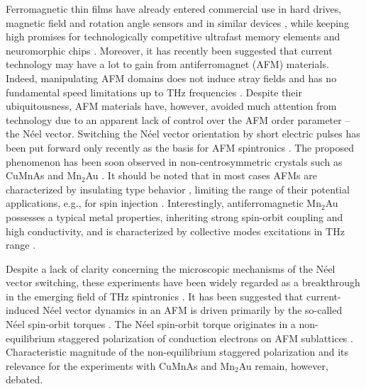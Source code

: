 \documentclass[%
  twocolumn,
  aps,
  prb,
  amsmath,
  amssymb,
  superscriptaddress,
  nofootinbib,
  floatfix
]{revtex4-1}
\newcommand{\0}{^{\phantom{\dagger}}}
\begin{document}
Ferromagnetic thin films have already entered commercial use in hard drives, magnetic field and rotation angle sensors and in similar devices  \cite{Parkin2003,Jogschies2015,Novoselov2019}, while keeping high promises for technologically competitive ultrafast memory elements \cite{Lau2016} and neuromorphic chips \cite{Fukami2016}. Moreover, it has recently been suggested that current technology may have a lot to gain from antiferromagnet (AFM) materials. Indeed, manipulating AFM domains does not induce stray fields and has no fundamental speed limitations up to THz frequencies \cite{Jungwirth2016AFMreview}. Despite their ubiquitousness, AFM materials have, however, avoided much attention from technology due to an apparent lack of control over the AFM order parameter -- the N\'eel vector. Switching the N\'eel vector orientation by short electric pulses has been put forward only recently as the basis for AFM spintronics \cite{MacDonald2011,Gomonay2014,Zelezny2014}. The proposed phenomenon has been soon observed in non-centrosymmetric crystals such as CuMnAs \cite{Wadley2016, Fina2016, Zelezny2018, Saidl2017} and Mn$_2$Au \cite{Barthem2013, Jordan2015, Bhattacharjee2018}. It should be noted that in most cases AFMs are characterized by insulating type behavior \cite{Pandey2017}, limiting the range of their potential applications, e.g., for spin injection \cite{Tshitoyan2015}. Interestingly, antiferromagnetic Mn$_2$Au possesses a typical metal properties, inheriting strong spin-orbit coupling and high conductivity, and is characterized by collective modes excitations in THz range \cite{Bhattacharjee2018}.

Despite a lack of clarity concerning the microscopic mechanisms of the N\'eel vector switching, these experiments have been widely regarded as a breakthrough in the emerging field of THz spintronics \cite{Bhattacharjee2018, Gomonay2016AFM, Olejnik2018, Jungwirth2018, Wadley2016, Jungwirth2016AFMreview, Baltz2018, Jungwirth2018, Hoffman2018}. It has been suggested that current-induced N\'eel vector dynamics in an AFM is driven primarily by the so-called N\'eel spin-orbit torques \cite{Brataas2012, Hals2013, Zelezny2014, 2014MokrousovSOT, Ghosh2017, SmejkalAFM_2017, Zelezny2018, Zhou2018, Manchon2018, Moriyama2018, Li2019, Chen2019, Zhou2019, Zhou2019a, Bodnar2018}. The N\'eel spin-orbit torque originates in a non-equilibrium staggered polarization of conduction electrons on AFM sublattices \cite{Zelezny2014, SmejkalAFM_2017, Zelezny2018, Manchon2018}. Characteristic magnitude of the non-equilibrium staggered polarization and its relevance for the experiments with CuMnAs and Mn$_2$Au remain, however, debated. 
\end{document}
